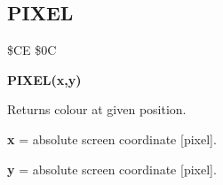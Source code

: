 \newpage
\subsection{PIXEL}
\begin{description}[leftmargin=2cm,style=nextline]
\item [Token:] \$CE \$0C
\item [Format:] {\bf PIXEL(x,y)}
\item [Usage:]  Returns colour at given position.

               {\bf x} = absolute screen coordinate [pixel].

               {\bf y} = absolute screen coordinate [pixel].
\end{description}



\newpage
